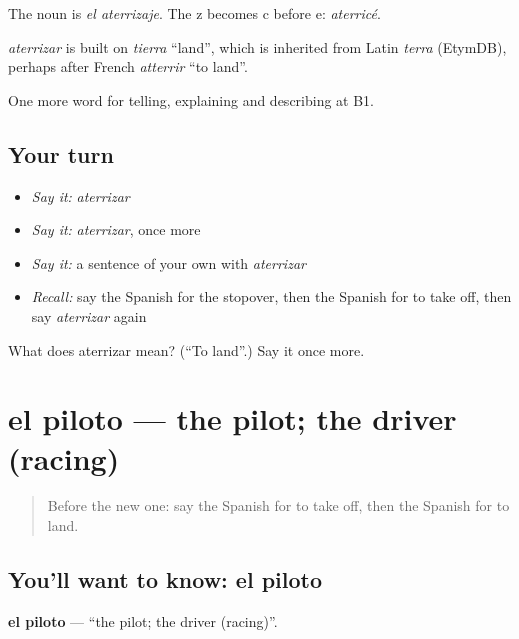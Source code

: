 The noun is \emph{el aterrizaje}. The z becomes c before e: \emph{aterricé}.

\begin{cousinweb}
\emph{aterrizar} is built on \emph{tierra} \textquotedblleft{}land\textquotedblright{}, which is inherited from Latin \emph{terra} (EtymDB), perhaps after French \emph{atterrir} \textquotedblleft{}to land\textquotedblright{}.
\end{cousinweb}

\begin{grammarlens}[title={What you've built}]
One more word for telling, explaining and describing at B1.
\end{grammarlens}

\subsection*{Your turn}
\begin{itemize}
\raggedright
  \item \emph{Say it:} \emph{aterrizar}
  \item \emph{Say it:} \emph{aterrizar}, once more
  \item \emph{Say it:} a sentence of your own with \emph{aterrizar}
  \item \emph{Recall:} say the Spanish for the stopover, then the Spanish for to take off, then say \emph{aterrizar} again
\end{itemize}

\begin{tcolorbox}[breakable,colback=teal!4,colframe=teal!35!black,title={Before you move on}]
What does aterrizar mean? (\textquotedblleft{}To land\textquotedblright{}.) Say it once more.
\end{tcolorbox}
\section[el piloto]{el piloto — the pilot; the driver (racing)}

\label{lesson:ES-C654-piloto}



\begin{quote}
Before the new one: say the Spanish for to take off, then the Spanish for to land.
\end{quote}

\subsection*{You'll want to know: el piloto}
\textbf{el piloto} — \textquotedblleft{}the pilot; the driver (racing)\textquotedblright{}.

